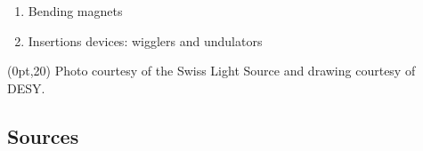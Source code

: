 \documentclass[10pt, xcolor=x11names, compress]{beamer}
\begin{document}
\begin{frame}
  \begin{enumerate}
  \item Bending magnets
  \item Insertions devices: wigglers and undulators
  \end{enumerate}

  \begin{textblock*}{0.7\linewidth}(0pt,20\TPVertModule)%
    \tiny%
    Photo courtesy of the Swiss Light Source and drawing courtesy of
    DESY.
  \end{textblock*}
\end{frame}

\subsection{Sources}
\end{document}
